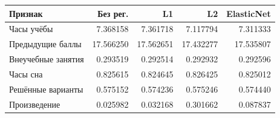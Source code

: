 \begin{tabular}{lrrrr}
\toprule
Признак & Без рег. & L1 & L2 & ElasticNet \\
\midrule
Часы учёбы & 7.368158 & 7.361718 & 7.117794 & 7.311333 \\
Предыдущие баллы & 17.566250 & 17.562651 & 17.432277 & 17.535807 \\
Внеучебные занятия & 0.293519 & 0.292514 & 0.292932 & 0.292596 \\
Часы сна & 0.825615 & 0.824645 & 0.826425 & 0.825012 \\
Решённые варианты & 0.575152 & 0.574236 & 0.575246 & 0.574440 \\
Произведение & 0.025982 & 0.032168 & 0.301662 & 0.087837 \\
\bottomrule
\end{tabular}
